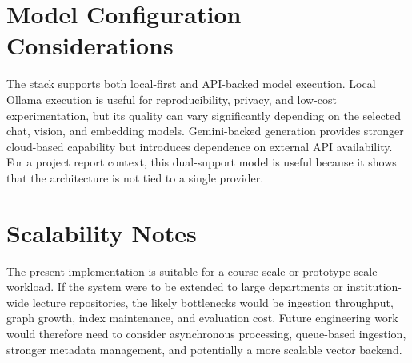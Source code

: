 \documentclass[12pt,a4paper,oneside]{report}
\begin{document}
\section*{Model Configuration Considerations}
The stack supports both local-first and API-backed model execution. Local Ollama execution is useful for reproducibility, privacy, and low-cost experimentation, but its quality can vary significantly depending on the selected chat, vision, and embedding models. Gemini-backed generation provides stronger cloud-based capability but introduces dependence on external API availability. For a project report context, this dual-support model is useful because it shows that the architecture is not tied to a single provider.

\section*{Scalability Notes}
The present implementation is suitable for a course-scale or prototype-scale workload. If the system were to be extended to large departments or institution-wide lecture repositories, the likely bottlenecks would be ingestion throughput, graph growth, index maintenance, and evaluation cost. Future engineering work would therefore need to consider asynchronous processing, queue-based ingestion, stronger metadata management, and potentially a more scalable vector backend.
\end{document}
